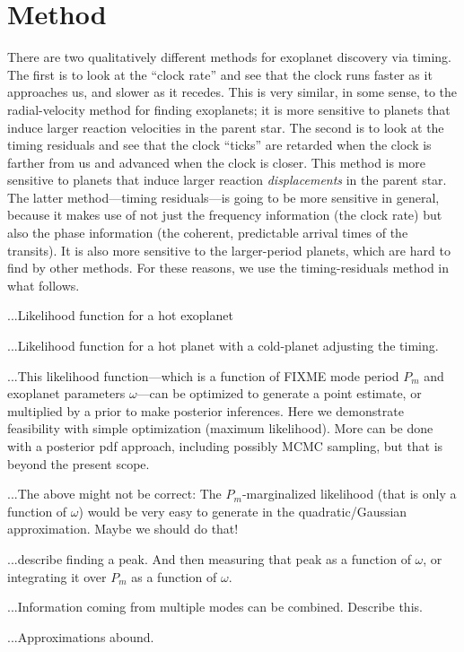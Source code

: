 \documentclass[12pt, preprint]{aastex}
\begin{document}
\section{Method}

There are two qualitatively different methods for exoplanet discovery
via timing.
The first is to look at the ``clock rate'' and see that the clock runs
faster as it approaches us, and slower as it recedes.
This is very similar, in some sense, to the radial-velocity method for
finding exoplanets; it is more sensitive to planets that induce larger
reaction velocities in the parent star.
The second is to look at the timing residuals and see that the clock
``ticks'' are retarded when the clock is farther from us and advanced
when the clock is closer.
This method is more sensitive to planets that induce larger reaction
\emph{displacements} in the parent star.
The latter method---timing residuals---is going to be more sensitive
in general, because it makes use of not just the frequency information
(the clock rate) but also the phase information (the coherent,
predictable arrival times of the transits).
It is also more sensitive to the larger-period planets, which are hard
to find by other methods.
For these reasons, we use the timing-residuals method in what follows.

...Likelihood function for a hot exoplanet

...Likelihood function for a hot planet with a cold-planet adjusting the timing.

...This likelihood function---which is a function of FIXME mode period $P_m$
and exoplanet parameters $\omega$---can be optimized to generate a
point estimate, or multiplied by a prior to make posterior inferences.
Here we demonstrate feasibility with simple optimization (maximum
likelihood).
More can be done with a posterior pdf approach, including possibly
MCMC sampling, but that is beyond the present scope.

...The above might not be correct: The $P_m$-marginalized likelihood
(that is only a function of $\omega$) would be very easy to generate
in the quadratic/Gaussian approximation.  Maybe we should do that!

...describe finding a peak.  And then measuring that peak as a
function of $\omega$, or integrating it over $P_m$ as a function of
$\omega$.

...Information coming from multiple modes can be combined.  Describe
this.

...Approximations abound.
\end{document}

